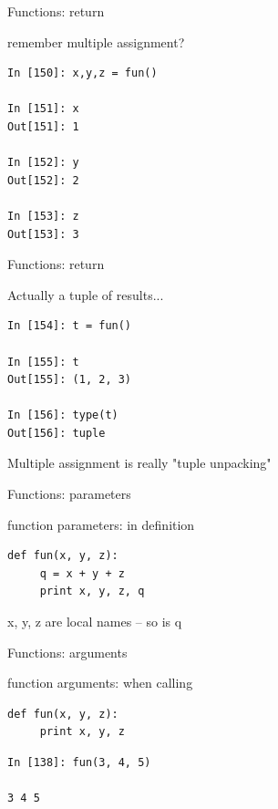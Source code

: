 \documentclass{beamer}
\begin{document}
\begin{frame}[fragile]{Functions: return}

{\Large remember multiple assignment?}

\begin{verbatim}
In [150]: x,y,z = fun()

In [151]: x
Out[151]: 1

In [152]: y
Out[152]: 2

In [153]: z
Out[153]: 3
\end{verbatim}

\end{frame}

\begin{frame}[fragile]{Functions: return}

{\Large Actually a tuple of results...}

\begin{verbatim}
In [154]: t = fun()

In [155]: t
Out[155]: (1, 2, 3)

In [156]: type(t)
Out[156]: tuple
\end{verbatim}

{\Large Multiple assignment is really "tuple unpacking"}

\end{frame}



\begin{frame}[fragile]{Functions: parameters}

{\Large function parameters: in definition}

\begin{verbatim}
def fun(x, y, z):
     q = x + y + z
     print x, y, z, q
\end{verbatim}

{\Large x, y, z are local names -- so is q}

\end{frame}

\begin{frame}[fragile]{Functions: arguments}

{\Large function arguments: when calling}

\begin{verbatim}
def fun(x, y, z):
     print x, y, z
\end{verbatim}
\begin{verbatim}
In [138]: fun(3, 4, 5)

3 4 5
\end{verbatim}

\end{frame}
\end{document}
